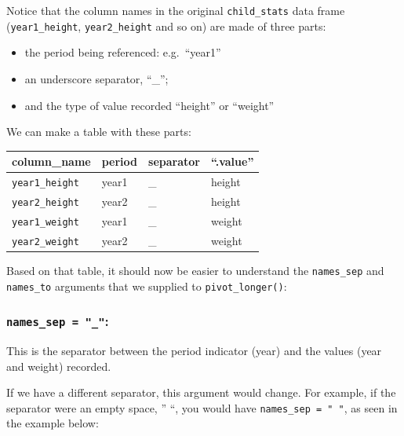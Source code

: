 \documentclass[
  letterpaper,
  DIV=11,
  numbers=noendperiod]{scrreprt}
\begin{document}
Notice that the column names in the original \texttt{child\_stats} data
frame (\texttt{year1\_height}, \texttt{year2\_height} and so on) are
made of three parts:

\begin{itemize}
\item
  the period being referenced: e.g.~``year1''
\item
  an underscore separator, ``\_'';
\item
  and the type of value recorded ``height'' or ``weight''
\end{itemize}

We can make a table with these parts:

\begin{longtable}[]{@{}llll@{}}
\toprule\noalign{}
column\_name & period & separator & ``.value'' \\
\midrule\noalign{}
\endhead
\bottomrule\noalign{}
\endlastfoot
\texttt{year1\_height} & year1 & \_ & height \\
\texttt{year2\_height} & year2 & \_ & height \\
\texttt{year1\_weight} & year1 & \_ & weight \\
\texttt{year2\_weight} & year2 & \_ & weight \\
\end{longtable}

Based on that table, it should now be easier to understand the
\texttt{names\_sep} and \texttt{names\_to} arguments that we supplied to
\texttt{pivot\_longer()}:

\subsubsection{\texorpdfstring{\texttt{names\_sep\ =\ "\_"}:}{names\_sep = "\_":}}\label{names_sep-_}

This is the separator between the period indicator (year) and the values
(year and weight) recorded.

If we have a different separator, this argument would change. For
example, if the separator were an empty space, '' ``, you would have
\texttt{names\_sep\ =\ "\ "}, as seen in the example below:
\end{document}
